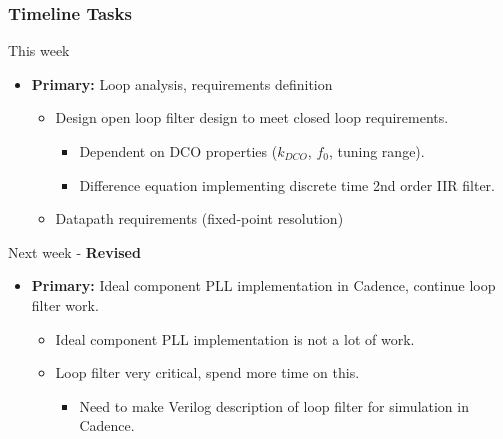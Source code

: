 \documentclass[t, screen, aspectratio=43]{beamer}
\begin{document}
\begin{frame}
	\frametitle{Timeline Tasks}
	\begin{block}{This week}
		\begin{itemize}
			\footnotesize
			\item \textbf{Primary:} Loop analysis, requirements definition
			\begin{itemize}
				\footnotesize
				\item Design open loop filter design to meet closed loop requirements.
				\begin{itemize}
					\item Dependent on DCO properties ($k_{DCO}$, $f_0$, tuning range).
					\item Difference equation implementing discrete time 2nd order IIR filter.
				\end{itemize} 
				\item Datapath requirements (fixed-point resolution)
			\end{itemize} 
		\end{itemize}    
	\end{block}
	\begin{block}{Next week - \color{red} \textbf{Revised}}
		\begin{itemize}
			\footnotesize
			\item \textbf{Primary:} Ideal component PLL implementation in Cadence, \color{red} continue loop filter work.
			\begin{itemize}
				\footnotesize
				\item Ideal component PLL implementation is not a lot of work.
				\item Loop filter very critical, spend more time on this.
				\begin{itemize}
					\footnotesize
					\item Need to make Verilog description of loop filter for simulation in Cadence.
				\end{itemize}
			\end{itemize} 
		\end{itemize}    
	\end{block}
\end{frame}

\end{document}
